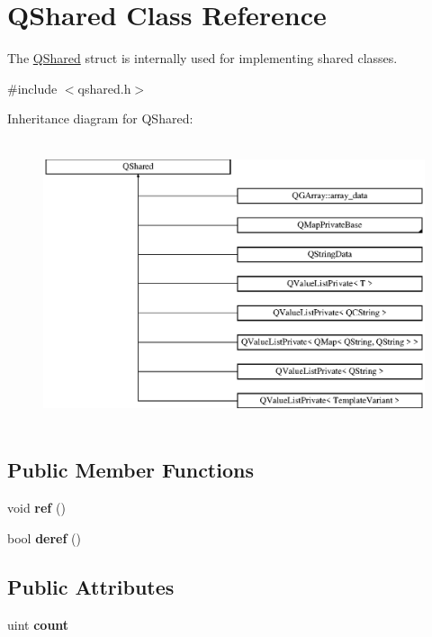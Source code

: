 \hypertarget{struct_q_shared}{}\section{Q\+Shared Class Reference}
\label{struct_q_shared}


The \mbox{\hyperlink{struct_q_shared}{Q\+Shared}} struct is internally used for implementing shared classes.  




{\ttfamily \#include $<$qshared.\+h$>$}

Inheritance diagram for Q\+Shared\+:\begin{figure}[H]
\begin{center}
\leavevmode
\includegraphics[height=8.400000cm]{struct_q_shared}
\end{center}
\end{figure}
\subsection*{Public Member Functions}
\begin{DoxyCompactItemize}
\item 
\mbox{\label{struct_q_shared_a20671806e1295621109b5f45b03432e9}} 
void {\bfseries ref} ()
\item 
\mbox{\label{struct_q_shared_aa2f1346500c450dff27c4e6ac27da337}} 
bool {\bfseries deref} ()
\end{DoxyCompactItemize}
\subsection*{Public Attributes}
\begin{DoxyCompactItemize}
\item 
\mbox{\label{struct_q_shared_a9961bb28bf070de1bf62deb83533411d}} 
uint {\bfseries count}
\end{DoxyCompactItemize}


